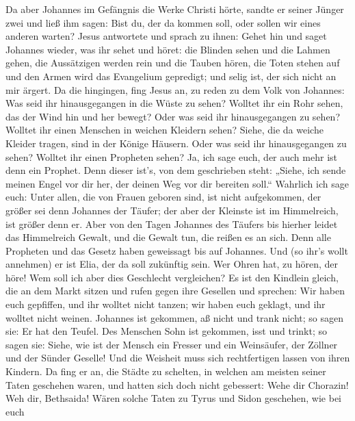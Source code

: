  Da aber Johannes im Gefängnis die Werke Christi hörte,
sandte er seiner Jünger zwei  und ließ ihm sagen: Bist du,
der da kommen soll, oder sollen wir eines anderen warten? 
Jesus antwortete und sprach zu ihnen: Gehet hin und saget Johannes
wieder, was ihr sehet und höret:  die Blinden sehen und
die Lahmen gehen, die Aussätzigen werden rein und die Tauben hören, die
Toten stehen auf und den Armen wird das Evangelium gepredigt;
 und selig ist, der sich nicht an mir ärgert.
 Da die hingingen, fing Jesus an, zu reden zu dem Volk von
Johannes: Was seid ihr hinausgegangen in die Wüste zu sehen? Wolltet ihr
ein Rohr sehen, das der Wind hin und her bewegt?  Oder was
seid ihr hinausgegangen zu sehen? Wolltet ihr einen Menschen in weichen
Kleidern sehen? Siehe, die da weiche Kleider tragen, sind in der Könige
Häusern.  Oder was seid ihr hinausgegangen zu sehen?
Wolltet ihr einen Propheten sehen? Ja, ich sage euch, der auch mehr ist
denn ein Prophet.  Denn dieser ist's, von dem geschrieben
steht: „Siehe, ich sende meinen Engel vor dir her, der deinen Weg vor
dir bereiten soll.``  Wahrlich ich sage euch: Unter
allen, die von Frauen geboren sind, ist nicht aufgekommen, der größer
sei denn Johannes der Täufer; der aber der Kleinste ist im Himmelreich,
ist größer denn er.  Aber von den Tagen Johannes des
Täufers bis hierher leidet das Himmelreich Gewalt, und die Gewalt tun,
die reißen es an sich.  Denn alle Propheten und das
Gesetz haben geweissagt bis auf Johannes.  Und (so ihr's
wollt annehmen) er ist Elia, der da soll zukünftig sein. 
Wer Ohren hat, zu hören, der höre!  Wem soll ich aber
dies Geschlecht vergleichen? Es ist den Kindlein gleich, die an dem
Markt sitzen und rufen gegen ihre Gesellen  und sprechen:
Wir haben euch gepfiffen, und ihr wolltet nicht tanzen; wir haben euch
geklagt, und ihr wolltet nicht weinen.  Johannes ist
gekommen, aß nicht und trank nicht; so sagen sie: Er hat den Teufel.
 Des Menschen Sohn ist gekommen, isst und trinkt; so
sagen sie: Siehe, wie ist der Mensch ein Fresser und ein Weinsäufer, der
Zöllner und der Sünder Geselle! Und die Weisheit muss sich rechtfertigen
lassen von ihren Kindern.  Da fing er an, die Städte zu
schelten, in welchen am meisten seiner Taten geschehen waren, und hatten
sich doch nicht gebessert:  Wehe dir Chorazin! Weh dir,
Bethsaida! Wären solche Taten zu Tyrus und Sidon geschehen, wie bei euch
